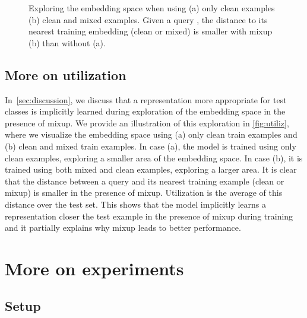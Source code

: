 \documentclass{article}
\begin{document}
\begin{figure}
\centering
{}
\caption{Exploring the embedding space when using (a) only clean examples (b) clean and mixed examples. Given a query , the distance  to its nearest training embedding (clean or mixed) is smaller with mixup (b) than without (a).}

\label{fig:utiliz}
\end{figure}

\subsection{More on utilization}
\label{sec:app-utilization}

In~\autoref{sec:discussion}, we discuss that a representation more appropriate for test classes is implicitly learned during exploration of the embedding space in the presence of mixup. We provide an illustration of this exploration in \autoref{fig:utiliz}, where we visualize the embedding space using (a) only clean train examples and (b) clean and mixed train examples. 
In case (a), the model is trained using only clean examples, exploring a smaller area of the embedding space. In case (b), it is trained using both mixed and clean examples, exploring a larger area. It is clear that the distance between a query and its nearest training example (clean or mixup) is smaller in the presence of mixup. Utilization is the average of this distance over the test set. This shows that the model implicitly learns a representation closer the test example in the presence of mixup during training and it partially explains why mixup leads to better performance.



\section{More on experiments}
\label{sec:app-exp}



\subsection{Setup}
\label{sec:app-exp_setup}
\end{document}
